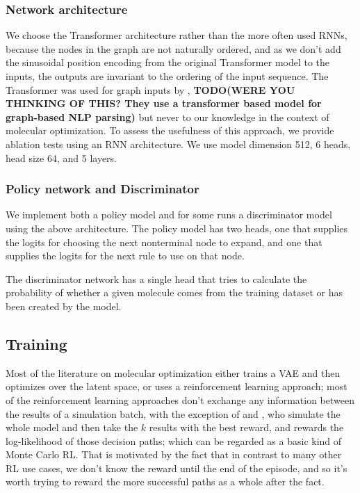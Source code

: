 \documentclass{article}
\newcommand{\TODO}[1]{{\bf TODO(#1)}}
\begin{document}
\subsubsection{Network architecture}
We choose the Transformer architecture \cite{vaswani2017} rather than the more often used RNNs, because the nodes in the graph are not naturally ordered, and as we don't add the sinusoidal position encoding from the original Transformer model to the inputs, the outputs are invariant to the ordering of the input sequence. The Transformer was used for graph inputs by \cite{kondratyuk2019}, \TODO{WERE YOU THINKING OF THIS? They use a transformer based model for graph-based NLP parsing} but never to our knowledge in the context of molecular optimization. To assess the usefulness of this approach, we provide ablation tests using an RNN architecture. We use model dimension 512, 6 heads, head size 64, and 5 layers. 

\subsubsection{Policy network and Discriminator}
We implement both a policy model and for some runs a discriminator model using the above architecture. The policy model has two heads, one that supplies the logits for choosing the next nonterminal node to expand, and one that supplies the logits for the next rule to use on that node.

The discriminator network has a single head that tries to calculate the probability of whether a given molecule comes from the training dataset or has been created by the model.

\subsection{Training}\label{sec:training}
Most of the literature on molecular optimization either trains a VAE and then optimizes over the latent space, or uses a reinforcement learning approach; most of the reinforcement learning approaches don't exchange any information between the results of a simulation batch, with the exception of \cite{segler2017, neil2018} and \cite{kraev2018}, who simulate the whole model and then take the $k$ results with the best reward, and rewards the log-likelihood of those decision paths; which can be regarded as a basic kind of Monte Carlo RL. That is motivated by the fact that in contrast to many other RL use cases, we don't know the reward until the end of the episode, and so it's worth trying to reward the more successful paths as a whole after the fact.
\end{document}
